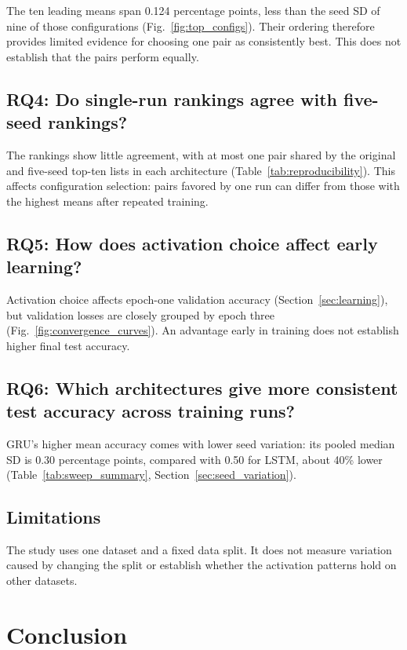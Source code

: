 \documentclass[conference,a4paper]{IEEEtran}
\begin{document}
The ten leading means span 0.124 percentage points, less
than the seed SD of nine of those configurations
(Fig.~\ref{fig:top_configs}). Their ordering therefore
provides limited evidence for choosing one pair as consistently
best. This does not establish that the pairs perform equally.

\subsection{RQ4: Do single-run rankings agree with five-seed rankings?}
\label{sec:rq4}

The rankings show little agreement, with at most one pair
shared by the original and five-seed top-ten lists in each
architecture (Table~\ref{tab:reproducibility}). This affects
configuration selection: pairs favored by one run can differ
from those with the highest means after repeated training.

\subsection{RQ5: How does activation choice affect early learning?}
\label{sec:rq5}

Activation choice affects epoch-one validation accuracy
(Section~\ref{sec:learning}), but validation losses are
closely grouped by epoch three (Fig.~\ref{fig:convergence_curves}).
An advantage early in training does not establish higher
final test accuracy.

\subsection{RQ6: Which architectures give more consistent test accuracy across training runs?}
\label{sec:rq6}

GRU's higher mean accuracy comes with lower seed variation:
its pooled median SD is 0.30 percentage points, compared
with 0.50 for LSTM, about 40\% lower
(Table~\ref{tab:sweep_summary}, Section~\ref{sec:seed_variation}).

\subsection{Limitations}

The study uses one dataset and a fixed data split. It does
not measure variation caused by changing the split or
establish whether the activation patterns hold on other
datasets. 

\section{Conclusion}
\end{document}
